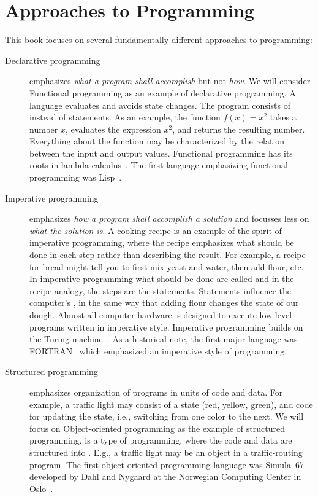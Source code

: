 \documentclass[springer.tex]{subfiles}
\begin{document}
\section{Approaches to Programming}
This book focuses on several fundamentally different approaches to programming: 
\begin{description}
\item[Declarative programming] emphasizes \emph{what a program shall accomplish} but not \emph{how}. We will consider Functional programming as an example of declarative programming. A  language evaluates  and avoids state changes. The program consists of  instead of statements. As an example, the function $f(x) = x^2$ takes a number $x$, evaluates the expression $x^2$, and returns the resulting number. Everything about the function may be characterized by the relation between the input and output values.  Functional programming has its roots in lambda calculus~\cite{church36}. The first language emphasizing functional programming was Lisp~\cite{mccarthy60}. 
\item[Imperative programming] emphasizes \emph{how a program shall accomplish a solution} and focusses less on \emph{what the solution is}. A cooking recipe is an example of the spirit of imperative programming, where the recipe emphasizes what should be done in each step rather than describing the result. For example, a recipe for bread might tell you to first mix yeast and water, then add flour, etc. In imperative programming what should be done are called  and in the recipe analogy, the steps are the statements. Statements influence the computer's , in the same way that adding flour changes the state of our dough. Almost all computer hardware is designed to execute low-level programs written in imperative style. Imperative programming builds on the Turing machine~\cite{turing36}. As a historical note, the first major language was FORTRAN~\cite{backus54} which emphasized an imperative style of programming.
\item[Structured programming] emphasizes organization of programs in units of code and data. For example, a traffic light may consist of a state (red, yellow, green), and code for updating the state, i.e., switching from one color to the next. We will focus on Object-oriented programming as the example of structured programming.  is a type of programming, where the code and data are structured into . E.g., a traffic light may be an object in a traffic-routing program. The first object-oriented programming language was Simula~67 developed by Dahl and Nygaard at the Norwegian Computing Center in Oslo~\cite{dahl.nygaard67}.

\end{description}
\end{document}
